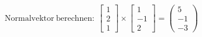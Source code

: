 \documentclass[preview]{standalone}
\begin{document}
\begin{center}
$\mathrm{Normalvektor \: berechnen: } \:\begin{bmatrix} 1 \\ 2 \\ 1 \end{bmatrix} \times \begin{bmatrix} 1 \\ -1 \\ 2 \end{bmatrix} \equal \begin{pmatrix} 5 \\ -1 \\ -3 \end{pmatrix}$
\end{center}
\end{document}
